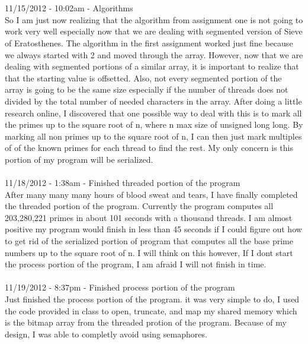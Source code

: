 \documentclass[12pt,letterpaper]{article}
\begin{document}
\\\\
11/15/2012 - 10:02am - Algorithms\\
So I am just now realizing that the algorithm from assignment one is not going to work very well especially now that we are dealing with segmented version of Sieve of Eratosthenes. The algorithm in the first assignment worked just fine because we always started with 2 and moved through the array. However, now that we are dealing with segmented portions of a similar array, it is important to realize that that the starting value is offsetted. Also, not every segmented portion of the array is going to be the same size especially if the number of threads does not divided by the total number of needed characters in the array. After doing a little research online, I discovered that one possible way to deal with this is to mark all the primes up to the square root of n, where n max size of unsigned long long. By marking all non primes up to the square root of n, I can then just mark multiples of of the known primes for each thread to find the rest. My only concern is this portion of my program will be serialized.
\\\\
11/18/2012 - 1:38am - Finished threaded portion of the program\\
After many many many hours of blood sweat and tears, I have finally completed the threaded portion of the program. Currently the program computes all 203,280,221 primes in about 101 seconds with a thousand threads. I am almost positive my program would finish in less than 45 seconds if I could figure out how to get rid of the serialized portion of program that computes all the base prime numbers up to the square root of n. I will think on this however, If I dont start the process portion of the program, I am afraid I will not finish in time.
\\\\
11/19/2012 - 8:37pm - Finished process portion of the program\\
Just finished the process portion of the program. it was very simple to do, I used the code provided in class to open, truncate, and map my shared memory which is the bitmap array from the threaded protion of the program. Because of my design, I was able to completly avoid using semaphores.
\end{document}
